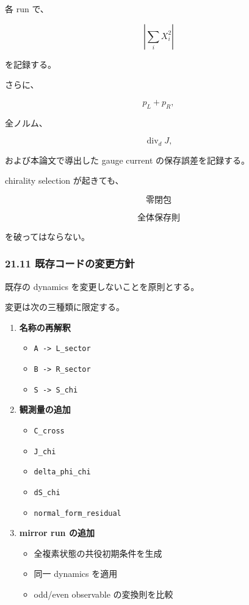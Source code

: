 \documentclass[
  a4paper,
]{ltjsarticle}
\providecommand{\tightlist}{%
  \setlength{\itemsep}{0pt}\setlength{\parskip}{0pt}}
\begin{document}
各 run で、

\[
\left|
\sum_iX_i^2
\right|
\]

を記録する。

さらに、

\[
p_L+p_R,
\]

全ノルム、

\[
\operatorname{div}_dJ,
\]

および本論文で導出した gauge current の保存誤差を記録する。

chirality selection が起きても、

\[
\boxed{
\text{零閉包}
}
\]

\[
\boxed{
\text{全体保存則}
}
\]

を破ってはならない。

\subsubsection{21.11
既存コードの変更方針}\label{ux65e2ux5b58ux30b3ux30fcux30c9ux306eux5909ux66f4ux65b9ux91dd}

既存の dynamics を変更しないことを原則とする。

変更は次の三種類に限定する。

\begin{enumerate}
\def\labelenumi{\arabic{enumi}.}
\tightlist
\item
  \textbf{名称の再解釈}

  \begin{itemize}
  \tightlist
  \item
    \texttt{A\ -\textgreater{}\ L\_sector}
  \item
    \texttt{B\ -\textgreater{}\ R\_sector}
  \item
    \texttt{S\ -\textgreater{}\ S\_chi}
  \end{itemize}
\item
  \textbf{観測量の追加}

  \begin{itemize}
  \tightlist
  \item
    \texttt{C\_cross}
  \item
    \texttt{J\_chi}
  \item
    \texttt{delta\_phi\_chi}
  \item
    \texttt{dS\_chi}
  \item
    \texttt{normal\_form\_residual}
  \end{itemize}
\item
  \textbf{mirror run の追加}

  \begin{itemize}
  \tightlist
  \item
    全複素状態の共役初期条件を生成
  \item
    同一 dynamics を適用
  \item
    odd/even observable の変換則を比較
  \end{itemize}
\end{enumerate}
\end{document}
